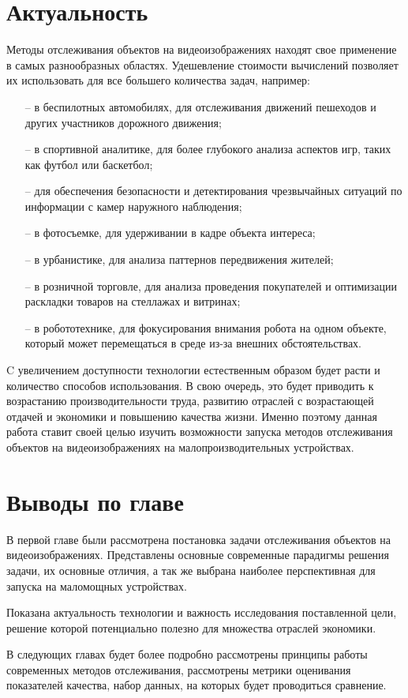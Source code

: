 \section{Актуальность}
Методы отслеживания объектов на видеоизображениях находят свое применение в самых разнообразных областях. 
Удешевление стоимости вычислений позволяет их использовать для все большего количества задач, например:
\begin{itemize}
    \item[--] в беспилотных автомобилях, для отслеживания движений пешеходов и других участников дорожного движения;
    \item[--] в спортивной аналитике, для более глубокого анализа аспектов игр, таких как футбол или баскетбол;
    \item[--] для обеспечения безопасности и детектирования чрезвычайных ситуаций по информации с камер наружного наблюдения;
    \item[--] в фотосъемке, для удерживании в кадре объекта интереса;  
    \item[--] в урбанистике, для анализа паттернов передвижения жителей;
    \item[--] в розничной торговле, для анализа проведения покупателей и оптимизации раскладки товаров на стеллажах и витринах;
    \item[--] в робототехнике, для фокусирования внимания робота на одном объекте, который может перемещаться в среде из-за внешних обстоятельствах. 
\end{itemize}

C увеличением доступности технологии естественным образом будет расти и количество способов использования. 
В свою очередь, это будет приводить к возрастанию производительности труда, развитию отраслей с возрастающей отдачей и экономики и повышению качества жизни.
Именно поэтому данная работа ставит своей целью изучить возможности запуска методов отслеживания объектов на видеоизображениях на малопроизводительных устройствах. 

\section{Выводы по главе}
В первой главе были рассмотрена постановка задачи отслеживания объектов на видеоизображениях. Представлены основные современные парадигмы решения задачи,
их основные отличия, а так же выбрана наиболее перспективная для запуска на маломощных устройствах. 

Показана актуальность технологии и важность исследования поставленной цели, решение которой потенциально полезно для множества отраслей экономики.

В следующих главах будет более подробно рассмотрены принципы работы современных методов отслеживания, рассмотрены метрики оценивания показателей качества, набор данных, на которых будет проводиться сравнение.